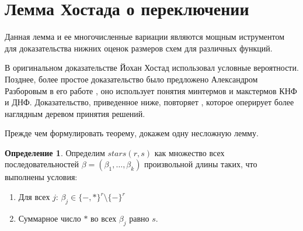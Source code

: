 \documentclass[12pt]{article}
\theoremstyle{plain}
\theoremstyle{remark}
\theoremstyle{definition}
\newtheorem{definition}{Определение}
\begin{document}
\section{Лемма Хостада о переключении}
Данная лемма и ее многочисленные вариации являются мощным иструментом для доказательства нижних оценок размеров схем для различных функций.

В оригинальном доказательстве \cite{hastad} Йохан Хостад использовал условные вероятности. Позднее, более простое доказательство было предложено Александром Разборовым в его работе \cite{Razborov}, оно использует понятия минтермов и макстермов КНФ и ДНФ. Доказательство, приведенное ниже, повторяет \cite{beame}, которое оперирует более наглядным деревом принятия решений.

Прежде чем формулировать теорему, докажем одну несложную лемму.

\begin{definition}
Определим $stars(r, s)$ как множество всех последовательностей $\beta = (\beta_1, \ldots, \beta_k)$ произвольной длины таких, что выполнены условия:
\begin{enumerate}
\item Для всех $j$: $\beta_j \in \{-, *\}^r \setminus \{-\}^r$
\item Суммарное число $*$ во всех $\beta_j$ равно $s$.
\end{enumerate}
\end{definition}
\end{document}
